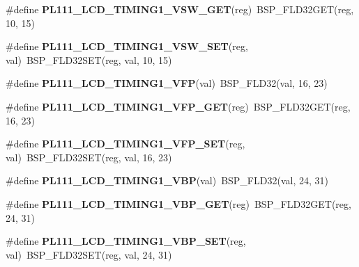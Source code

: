 \begin{DoxyCompactItemize}
\item 
\mbox{\label{arm-pl111-regs_8h_a607ab7bcfb37c4b9c1f2fc88c38e74f5}} 
\#define {\bfseries P\+L111\+\_\+\+L\+C\+D\+\_\+\+T\+I\+M\+I\+N\+G1\+\_\+\+V\+S\+W\+\_\+\+G\+ET}(reg)~B\+S\+P\+\_\+\+F\+L\+D32\+G\+ET(reg, 10, 15)
\item 
\mbox{\label{arm-pl111-regs_8h_a5f7019e12f9f2789065d081e76089fc4}} 
\#define {\bfseries P\+L111\+\_\+\+L\+C\+D\+\_\+\+T\+I\+M\+I\+N\+G1\+\_\+\+V\+S\+W\+\_\+\+S\+ET}(reg,  val)~B\+S\+P\+\_\+\+F\+L\+D32\+S\+ET(reg, val, 10, 15)
\item 
\mbox{\label{arm-pl111-regs_8h_aa941d00ebb70331bfb290bc7f9560658}} 
\#define {\bfseries P\+L111\+\_\+\+L\+C\+D\+\_\+\+T\+I\+M\+I\+N\+G1\+\_\+\+V\+FP}(val)~B\+S\+P\+\_\+\+F\+L\+D32(val, 16, 23)
\item 
\mbox{\label{arm-pl111-regs_8h_a147869a93658615f83dc502a4da7f31e}} 
\#define {\bfseries P\+L111\+\_\+\+L\+C\+D\+\_\+\+T\+I\+M\+I\+N\+G1\+\_\+\+V\+F\+P\+\_\+\+G\+ET}(reg)~B\+S\+P\+\_\+\+F\+L\+D32\+G\+ET(reg, 16, 23)
\item 
\mbox{\label{arm-pl111-regs_8h_aa3524a4a045918dff91bc3c82f3a33e3}} 
\#define {\bfseries P\+L111\+\_\+\+L\+C\+D\+\_\+\+T\+I\+M\+I\+N\+G1\+\_\+\+V\+F\+P\+\_\+\+S\+ET}(reg,  val)~B\+S\+P\+\_\+\+F\+L\+D32\+S\+ET(reg, val, 16, 23)
\item 
\mbox{\label{arm-pl111-regs_8h_afc2061f82b4ee5f0665695fb4463fdb5}} 
\#define {\bfseries P\+L111\+\_\+\+L\+C\+D\+\_\+\+T\+I\+M\+I\+N\+G1\+\_\+\+V\+BP}(val)~B\+S\+P\+\_\+\+F\+L\+D32(val, 24, 31)
\item 
\mbox{\label{arm-pl111-regs_8h_ac70dfc643986d009aa1bb7295a726697}} 
\#define {\bfseries P\+L111\+\_\+\+L\+C\+D\+\_\+\+T\+I\+M\+I\+N\+G1\+\_\+\+V\+B\+P\+\_\+\+G\+ET}(reg)~B\+S\+P\+\_\+\+F\+L\+D32\+G\+ET(reg, 24, 31)
\item 
\mbox{\label{arm-pl111-regs_8h_a9d51327cf988932ccc390f2470aacd3e}} 
\#define {\bfseries P\+L111\+\_\+\+L\+C\+D\+\_\+\+T\+I\+M\+I\+N\+G1\+\_\+\+V\+B\+P\+\_\+\+S\+ET}(reg,  val)~B\+S\+P\+\_\+\+F\+L\+D32\+S\+ET(reg, val, 24, 31)

\end{DoxyCompactItemize}
